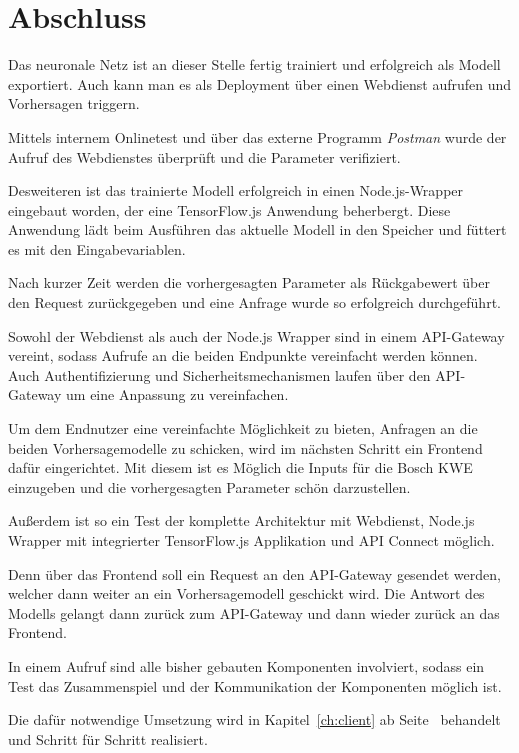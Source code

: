 \section{Abschluss}
Das neuronale Netz ist an dieser Stelle fertig trainiert und erfolgreich als Modell exportiert. Auch kann man es als
Deployment über einen Webdienst aufrufen und Vorhersagen triggern.

Mittels internem Onlinetest und über das externe Programm \textit{Postman} wurde der Aufruf des Webdienstes überprüft
und die Parameter verifiziert.

Desweiteren ist das trainierte Modell erfolgreich in einen Node.js-Wrapper eingebaut worden, der eine TensorFlow.js
Anwendung beherbergt. Diese Anwendung lädt beim Ausführen das aktuelle Modell in den Speicher und füttert es mit den
Eingabevariablen.

Nach kurzer Zeit werden die vorhergesagten Parameter als Rückgabewert über den Request zurückgegeben und eine Anfrage
wurde so erfolgreich durchgeführt.

Sowohl der Webdienst als auch der Node.js Wrapper sind in einem API-Gateway vereint, sodass Aufrufe an die beiden
Endpunkte vereinfacht werden können. Auch Authentifizierung und Sicherheitsmechanismen laufen über den API-Gateway um
eine Anpassung zu vereinfachen.

Um dem Endnutzer eine vereinfachte Möglichkeit zu bieten, Anfragen an die beiden Vorhersagemodelle zu schicken, wird
im nächsten Schritt ein Frontend dafür eingerichtet. Mit diesem ist es Möglich die Inputs für die Bosch KWE einzugeben
und die vorhergesagten Parameter schön darzustellen.

Außerdem ist so ein Test der komplette Architektur mit Webdienst, Node.js Wrapper mit integrierter TensorFlow.js
Applikation und API Connect möglich.

Denn über das Frontend soll ein Request an den API-Gateway gesendet werden, welcher dann weiter an ein Vorhersagemodell
geschickt wird. Die Antwort des Modells gelangt dann zurück zum API-Gateway und dann wieder zurück an das Frontend.

In einem Aufruf sind alle bisher gebauten Komponenten involviert, sodass ein Test das Zusammenspiel und der
Kommunikation der Komponenten möglich ist.

Die dafür notwendige Umsetzung wird in Kapitel~\ref{ch:client} ab Seite~\pageref{ch:client} behandelt und Schritt für
Schritt realisiert.